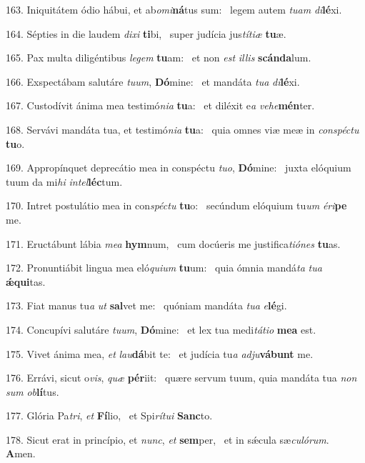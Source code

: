 163. Iniquitátem ódio hábui, et ab\textit{o}\textit{mi}\textbf{ná}tus sum: \ast\  legem autem \textit{tu}\textit{am} \textit{di}\textbf{lé}xi.\

164. Sépties in die laudem \textit{di}\textit{xi} \textbf{ti}bi, \ast\  super judícia jus\textit{tí}\textit{ti}\textit{æ} \textbf{tu}æ.\

165. Pax multa diligéntibus \textit{le}\textit{gem} \textbf{tu}am: \ast\  et non \textit{est} \textit{il}\textit{lis} \textbf{scán}\textbf{da}lum.\

166. Exspectábam salutáre \textit{tu}\textit{um}, \textbf{Dó}mine: \ast\  et mandáta \textit{tu}\textit{a} \textit{di}\textbf{lé}xi.\

167. Custodívit ánima mea testimó\textit{ni}\textit{a} \textbf{tu}a: \ast\  et diléxit e\textit{a} \textit{ve}\textit{he}\textbf{mén}ter.\

168. Servávi mandáta tua, et testimó\textit{ni}\textit{a} \textbf{tu}a: \ast\  quia omnes viæ meæ in \textit{con}\textit{spéc}\textit{tu} \textbf{tu}o.\

169. Appropínquet deprecátio mea in conspéctu \textit{tu}\textit{o}, \textbf{Dó}mine: \ast\  juxta elóquium tuum da mi\textit{hi} \textit{in}\textit{tel}\textbf{léc}tum.\

170. Intret postulátio mea in con\textit{spéc}\textit{tu} \textbf{tu}o: \ast\  secúndum elóquium tu\textit{um} \textit{é}\textit{ri}\textbf{pe} me.\

171. Eructábunt lábia \textit{me}\textit{a} \textbf{hym}num, \ast\  cum docúeris me justifica\textit{ti}\textit{ó}\textit{nes} \textbf{tu}as.\

172. Pronuntiábit lingua mea eló\textit{qui}\textit{um} \textbf{tu}um: \ast\  quia ómnia mandá\textit{ta} \textit{tu}\textit{a} \textbf{ǽ}\textbf{qui}tas.\

173. Fiat manus tu\textit{a} \textit{ut} \textbf{sal}vet me: \ast\  quóniam mandáta \textit{tu}\textit{a} \textit{e}\textbf{lé}gi.\

174. Concupívi salutáre \textit{tu}\textit{um}, \textbf{Dó}mine: \ast\  et lex tua medi\textit{tá}\textit{ti}\textit{o} \textbf{me}\textbf{a} est.\

175. Vivet ánima mea, \textit{et} \textit{lau}\textbf{dá}bit te: \ast\  et judícia tu\textit{a} \textit{ad}\textit{ju}\textbf{vá}\textbf{bunt} me.\

176. Errávi, sicut o\textit{vis}, \textit{quæ} \textbf{pér}iit: \ast\  quære servum tuum, quia mandáta tua \textit{non} \textit{sum} \textit{ob}\textbf{lí}tus.\

177. Glória Pa\textit{tri}, \textit{et} \textbf{Fí}lio, \ast\  et Spi\textit{rí}\textit{tu}\textit{i} \textbf{Sanc}to.\

178. Sicut erat in princípio, et \textit{nunc}, \textit{et} \textbf{sem}per, \ast\  et in sǽcula sæ\textit{cu}\textit{ló}\textit{rum}. \textbf{A}men.\

